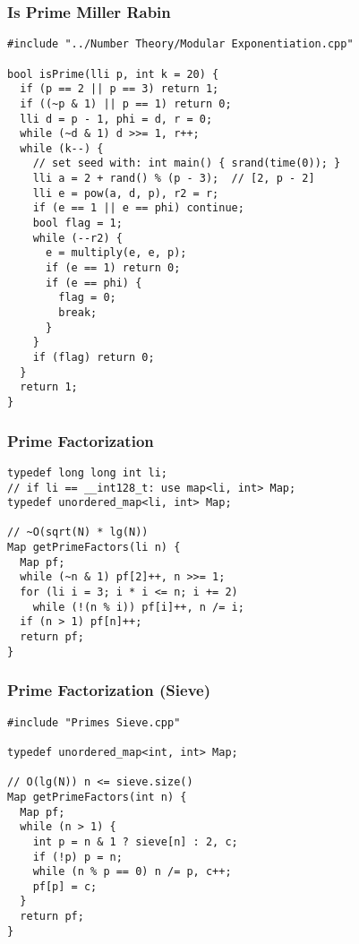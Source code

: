 \documentclass[twoside]{article}
\begin{document}
\begin{multicols*}{2}
\subsubsection*{Is Prime Miller Rabin}
\begin{verbatim}
#include "../Number Theory/Modular Exponentiation.cpp"

bool isPrime(lli p, int k = 20) {
  if (p == 2 || p == 3) return 1;
  if ((~p & 1) || p == 1) return 0;
  lli d = p - 1, phi = d, r = 0;
  while (~d & 1) d >>= 1, r++;
  while (k--) {
    // set seed with: int main() { srand(time(0)); }
    lli a = 2 + rand() % (p - 3);  // [2, p - 2]
    lli e = pow(a, d, p), r2 = r;
    if (e == 1 || e == phi) continue;
    bool flag = 1;
    while (--r2) {
      e = multiply(e, e, p);
      if (e == 1) return 0;
      if (e == phi) {
        flag = 0;
        break;
      }
    }
    if (flag) return 0;
  }
  return 1;
}
\end{verbatim}

\subsubsectionfont{\large\bfseries\sffamily\underline}
\subsubsection*{Prime Factorization}
\begin{verbatim}
typedef long long int li;
// if li == __int128_t: use map<li, int> Map;
typedef unordered_map<li, int> Map;

// ~O(sqrt(N) * lg(N))
Map getPrimeFactors(li n) {
  Map pf;
  while (~n & 1) pf[2]++, n >>= 1;
  for (li i = 3; i * i <= n; i += 2)
    while (!(n % i)) pf[i]++, n /= i;
  if (n > 1) pf[n]++;
  return pf;
}
\end{verbatim}

\subsubsectionfont{\large\bfseries\sffamily\underline}
\subsubsection*{Prime Factorization (Sieve)}
\begin{verbatim}
#include "Primes Sieve.cpp"

typedef unordered_map<int, int> Map;

// O(lg(N)) n <= sieve.size()
Map getPrimeFactors(int n) {
  Map pf;
  while (n > 1) {
    int p = n & 1 ? sieve[n] : 2, c;
    if (!p) p = n;
    while (n % p == 0) n /= p, c++;
    pf[p] = c;
  }
  return pf;
}
\end{verbatim}


\end{multicols*}
\end{document}
